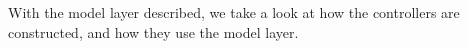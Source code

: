 \begin{comment}
An overview of how the general structure of the CRUD methods implemented in the Model Services is described here, and gives you an idea of how the controller parts of the website have services available that can work on the model.

\textbf{CRUD}
\begin{description}[style=nextline]
	\item[Create]
	As input parameter you get an object of the given entity to be created, e.g. Bicycle.
	This fields of this object is then used to insert the object into the database.
	
	\item[Read]
	As input parameter you get the primary key of the desired entity to be read.
	This primary key is then used to select the corresponding row from the database.
	
	\item[Update]
	As input parameter you get an object of the given entity to be updated.
	One of the attributes of the object correponds to the primary key of corresponding table in the database.
	This attribute is used to identify the object, where an update query is then used to update the given row to the attributes of the input object.
	
	\item[Delete]
	As input parameter you get the primary key of the desired entity to be deleted.
	This primary key is then used to delete the corresponding from the the database.
	
\end{description}
\end{comment}
With the model layer described, we take a look at how the controllers are constructed, and how they use the model layer.